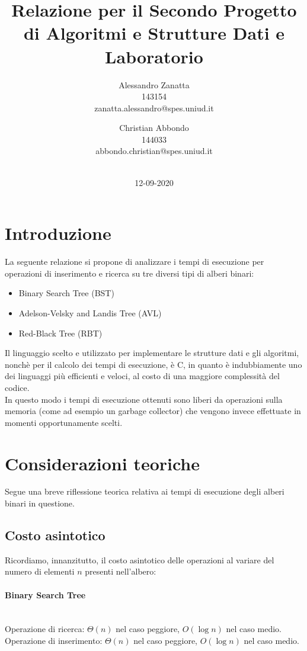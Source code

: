 \documentclass{article}
\title{Relazione per il Secondo Progetto di Algoritmi e Strutture Dati e Laboratorio}
\date{12-09-2020}
\author{Alessandro Zanatta \\ 143154 \\ zanatta.alessandro@spes.uniud.it\\ \and Christian Abbondo \\ 144033 \\ abbondo.christian@spes.uniud.it\\ \\}
\begin{document}
	
	\maketitle
	\newpage
	
	
	\tableofcontents	
	\newpage
	
	\section{Introduzione}
	La seguente relazione si propone di analizzare i tempi di esecuzione per operazioni di inserimento e ricerca su tre diversi tipi di alberi binari: 
	\begin{itemize}
		\item Binary Search Tree (BST)
		\item Adelson-Velsky and Landis Tree (AVL)
		\item Red-Black Tree (RBT)
	\end{itemize}
	 
	Il linguaggio scelto e utilizzato per implementare le strutture dati e gli algoritmi, nonchè per il calcolo dei tempi di esecuzione, è C, in quanto è indubbiamente uno dei linguaggi più efficienti e veloci, al costo di una maggiore complessità del codice. \\ In questo modo i tempi di esecuzione ottenuti sono liberi da operazioni sulla memoria (come ad esempio un garbage collector) che vengono invece effettuate in momenti opportunamente scelti.
	\newpage
	
	
	\section{Considerazioni teoriche}
	Segue una breve riflessione teorica relativa ai tempi di esecuzione degli alberi binari in questione.
	
	\subsection{Costo asintotico}
	Ricordiamo, innanzitutto, il costo asintotico delle operazioni al variare del numero di elementi $n$ presenti nell'albero:
	
	\paragraph{Binary Search Tree}\mbox{}\\
	Operazione di ricerca: $\Theta\left(n\right)$ nel caso peggiore, $O\left(\log{n}\right)$ nel caso medio.\\
	Operazione di inserimento: $\Theta\left(n\right)$ nel caso peggiore, $O\left(\log{n}\right)$ nel caso medio. \\
	
\end{document}
